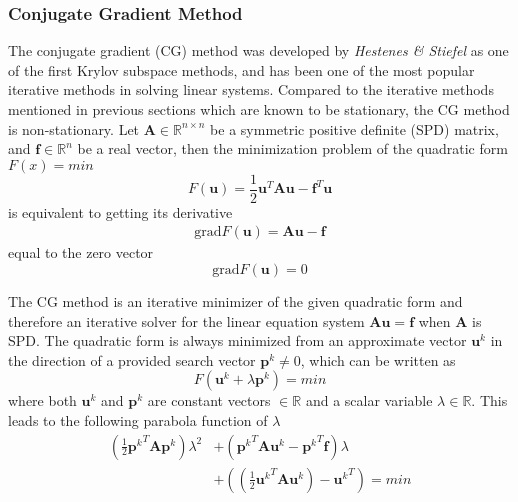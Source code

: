 \subsubsection{Conjugate Gradient Method}
The conjugate gradient (CG) method was developed by \textit{Hestenes \& Stiefel} \cite{hestenes1952methods} as one of the first Krylov subspace methods, and has been one of the most popular iterative methods in solving linear systems. Compared to the iterative methods mentioned in previous sections which are known to be stationary, the CG method is non-stationary. Let $\boldsymbol{A} \in \mathbb{R}^{n\times n}$ be a symmetric positive definite (SPD) matrix, and $\boldsymbol{f} \in \mathbb{R}^n$ be a real vector, then the minimization problem of the quadratic form $F(x) = min$
\begin{equation}
    F(\boldsymbol{u}) = \frac{1}{2}\boldsymbol{u}^T\boldsymbol{A}\boldsymbol{u} - \boldsymbol{f}^T\boldsymbol{u}
\end{equation}
is equivalent to getting its derivative 
\begin{align}
    \text{grad} F(\boldsymbol{u}) = \boldsymbol{Au - f}
\end{align}
equal to the zero vector
\begin{equation}
    \text{grad} F(\boldsymbol{u}) = 0
    \label{eqn:cg_grad}
\end{equation}

The CG method is an iterative minimizer of the given quadratic form and therefore an iterative solver for the linear equation system $\boldsymbol{Au=f}$ when $\boldsymbol{A}$ is SPD. The quadratic form is always minimized from an approximate vector $\boldsymbol{u}^k$ in the direction of a provided search vector $\boldsymbol{p}^k \neq 0$, which can be written as
\begin{equation}
    F(\boldsymbol{u}^k + \lambda\boldsymbol{p}^k) = min
\end{equation}
where both $\boldsymbol{u}^k$ and $\boldsymbol{p}^k$ are constant vectors $\in \mathbb{R}$ and a scalar variable $\lambda \in \mathbb{R}$. This leads to the following parabola function of $\lambda$
\begin{align}
    (\frac{1}{2}{\boldsymbol{p}^{k}}^{T} \boldsymbol{A} \boldsymbol{p}^k) \lambda^2 &+ ({\boldsymbol{p}^{k}}^{T} \boldsymbol{A} \boldsymbol{u}^k - {\boldsymbol{p}^{k}}^T\boldsymbol{f})\lambda \nonumber \\
    &+ ((\frac{1}{2}{\boldsymbol{u}^{k}}^{T} \boldsymbol{A} \boldsymbol{u}^k) - {\boldsymbol{u}^k}^T) = min
\end{align}

